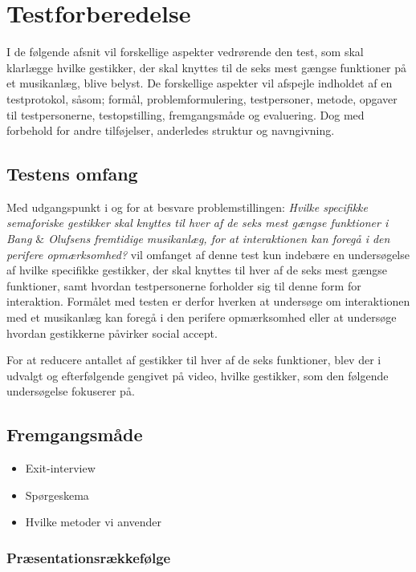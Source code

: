 \section{Testforberedelse}
\label{Testforberedelse}
%
I de følgende afsnit vil forskellige aspekter vedrørende den test, som skal klarlægge hvilke gestikker, der skal knyttes til de seks mest gængse funktioner på et musikanlæg, blive belyst. De forskellige aspekter vil afspejle indholdet af en testprotokol, såsom; formål, problemformulering, testpersoner, metode, opgaver til testpersonerne, testopstilling, fremgangsmåde og evaluering. Dog med forbehold for andre tilføjelser, anderledes struktur og navngivning. 
%

\subsection{Testens omfang}
\label{TestensOmfangValgAfGestikker}
%
Med udgangspunkt i og for at besvare problemstillingen: \textit{Hvilke specifikke semaforiske gestikker skal knyttes til hver af de seks mest gængse funktioner i Bang $\&$ Olufsens fremtidige musikanlæg, for at interaktionen kan foregå i den perifere opmærksomhed?} vil omfanget af denne test kun indebære en undersøgelse af hvilke specifikke gestikker, der skal knyttes til hver af de seks mest gængse funktioner, samt hvordan testpersonerne forholder sig til denne form for interaktion. Formålet med testen er derfor hverken at undersøge om interaktionen med et musikanlæg kan foregå i den perifere opmærksomhed eller at undersøge hvordan gestikkerne påvirker social accept. 

For at reducere antallet af gestikker til hver af de seks funktioner, blev der i  udvalgt og efterfølgende gengivet på video, hvilke gestikker, som den følgende undersøgelse fokuserer på. 

%
\subsection{Fremgangsmåde}
\label{FremgangsmaadeValgAfGestikker}
%
\begin{itemize}
  \item Exit-interview
  \item Spørgeskema
  \item Hvilke metoder vi anvender 
\end{itemize}

\subsubsection{Præsentationsrækkefølge}
\label{PraesentationsraekkefoelgeValgAfGestikker}
%

